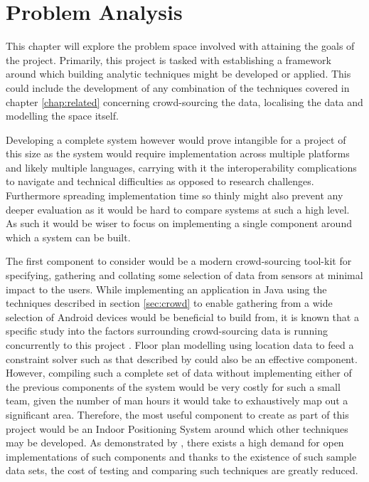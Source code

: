 \documentclass{UoYCSproject}
\begin{document}
    \chapter{Problem Analysis}
    \label{chap:problem}
    
        This chapter will explore the problem space involved with attaining the goals of the project. Primarily, this project is tasked with establishing a framework around which building analytic techniques might be developed or applied. This could include the development of any combination of the techniques covered in chapter \ref{chap:related} concerning crowd-sourcing the data, localising the data and modelling the space itself.
        
        Developing a complete system however would prove intangible for a project of this size as the system would require implementation across multiple platforms and likely multiple languages, carrying with it the interoperability complications to navigate and technical difficulties as opposed to research challenges. Furthermore spreading implementation time so thinly might also prevent any deeper evaluation as it would be hard to compare systems at such a high level. As such it would be wiser to focus on implementing a single component around which a system can be built.
        
        The first component to consider would be a modern crowd-sourcing tool-kit for specifying, gathering and collating some selection of data from sensors at minimal impact to the users. While implementing an application in Java using the techniques described in section \ref{sec:crowd} to enable gathering from a wide selection of Android devices would be beneficial to build from, it is known that a specific study into the factors surrounding crowd-sourcing data is running concurrently to this project \citep{IainBate}. Floor plan modelling using location data to feed a constraint solver such as that described by \citet{charman1994constraint} could also be an effective component. However, compiling such a complete set of data without implementing either of the previous components of the system would be very costly for such a small team, given the number of man hours it would take to exhaustively map out a significant area. Therefore, the most useful component to create as part of this project would be an Indoor Positioning System around which other techniques may be developed. As demonstrated by \citet{torres2014ujiindoorloc}, there exists a high demand for open implementations of such components and thanks to the existence of such sample data sets, the cost of testing and comparing such techniques are greatly reduced.
        
\end{document}
